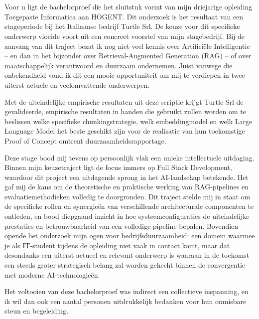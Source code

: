 \chapter*{}%
\label{ch:voorwoord}

Voor u ligt de bachelorproef die het sluitstuk vormt van mijn driejarige opleiding Toegepaste Informatica aan HOGENT. Dit onderzoek is het resultaat van een stageperiode bij het Italiaanse bedrijf Turtle Srl. De keuze voor dit specifieke onderwerp vloeide voort uit een concreet voorstel van mijn stagebedrijf. Bij de aanvang van dit traject bezat ik nog niet veel kennis over Artificiële Intelligentie -- en dan in het bijzonder over Retrieval-Augmented Generation (RAG) -- of over maatschappelijk verantwoord en duurzaam ondernemen. Juist vanwege die onbekendheid vond ik dit een mooie opportuniteit om mij te verdiepen in twee uiterst actuele en veelomvattende onderwerpen.

Met de uiteindelijke empirische resultaten uit deze scriptie krijgt Turtle Srl de gevalideerde, empirische resultaten in handen die gebruikt zullen worden om te beslissen welke specifieke chunkingstrategie, welk embeddingmodel en welk Large Language Model het beste geschikt zijn voor de realisatie van hun toekomstige Proof of Concept omtrent duurzaamheidsrapportage.

Deze stage bood mij tevens op persoonlijk vlak een unieke intellectuele uitdaging. Binnen mijn keuzetraject ligt de focus immers op Full Stack Development, waardoor dit project een uitdagende sprong in het AI-landschap betekende. Het gaf mij de kans om de theoretische en praktische werking van RAG-pipelines en evaluatiemethodieken volledig te doorgronden. Dit traject stelde mij in staat om de specifieke rollen en synergieën van verschillende architecturale componenten te ontleden, en bood diepgaand inzicht in hoe systeemconfiguraties de uiteindelijke prestaties en betrouwbaarheid van een volledige pipeline bepalen. Bovendien opende het onderzoek mijn ogen voor bedrijfsduurzaamheid: een domein waarmee je als IT-student tijdens de opleiding niet vaak in contact komt, maar dat desondanks een uiterst actueel en relevant onderwerp is waaraan in de toekomst een steeds groter strategisch belang zal worden gehecht binnen de convergentie met moderne AI-technologieën.

Het voltooien van deze bachelorproef was indirect een collectieve inspanning, en ik wil dan ook een aantal personen uitdrukkelijk bedanken voor hun onmisbare steun en begeleiding.

